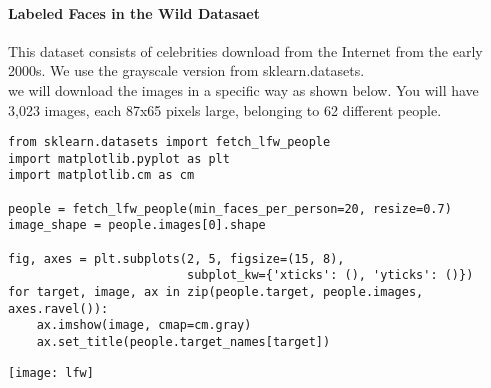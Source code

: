 \documentclass[12pt]{article}
\begin{document}
\paragraph{Labeled Faces in the Wild Datasaet} 
This dataset consists of celebrities download from the Internet from the early 2000s.  We use the grayscale version from sklearn.datasets.\\

\noindent
we will download the images in a specific way as shown below.  You will have 3,023 images, each 87x65 pixels large, belonging to 62 different people.  
\vspace{1cm}

\begin{lstlisting}
from sklearn.datasets import fetch_lfw_people
import matplotlib.pyplot as plt
import matplotlib.cm as cm

people = fetch_lfw_people(min_faces_per_person=20, resize=0.7)
image_shape = people.images[0].shape

fig, axes = plt.subplots(2, 5, figsize=(15, 8),
                         subplot_kw={'xticks': (), 'yticks': ()})
for target, image, ax in zip(people.target, people.images, axes.ravel()):
    ax.imshow(image, cmap=cm.gray)
    ax.set_title(people.target_names[target])
\end{lstlisting} 

\vspace{1cm}
\texttt{[image: lfw]}

\newpage
\end{document}
